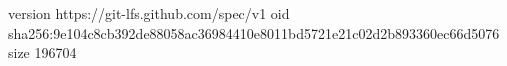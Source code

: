 version https://git-lfs.github.com/spec/v1
oid sha256:9e104c8cb392de88058ac36984410e8011bd5721e21c02d2b893360ec66d5076
size 196704
